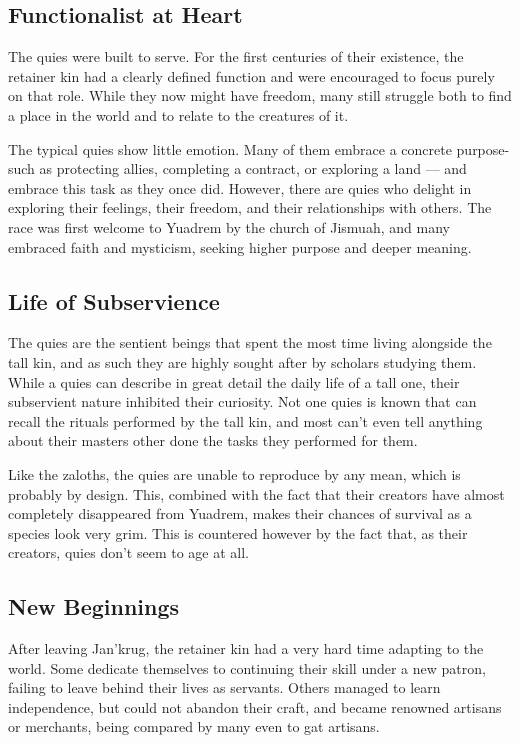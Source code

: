 \subsection*{Functionalist at Heart}
    The quies were built to serve.
    For the first centuries of their existence, the retainer kin had a clearly defined function and were encouraged to focus purely on that role.
    While they now might have freedom, many still struggle both to find a place in the world and to relate to the creatures of it.

    The typical quies show little emotion.
    Many of them embrace a concrete purpose-such as protecting allies, completing a contract, or exploring a land --- and embrace this task as they once did.
    However, there are quies who delight in exploring their feelings, their freedom, and their relationships with others.
    The race was first welcome to Yuadrem by the church of Jismuah, and many embraced faith and mysticism, seeking higher purpose and deeper meaning.

\subsection*{Life of Subservience}
    The quies are the sentient beings that spent the most time living alongside the tall kin, and as such they are highly sought after by scholars studying them.
    While a quies can describe in great detail the daily life of a tall one, their subservient nature inhibited their curiosity.
    Not one quies is known that can recall the rituals performed by the tall kin, and most can't even tell anything about their masters other done the tasks they performed for them.

    Like the zaloths, the quies are unable to reproduce by any mean, which is probably by design.
    This, combined with the fact that their creators have almost completely disappeared from Yuadrem, makes their chances of survival as a species look very grim.
    This is countered however by the fact that, as their creators, quies don't seem to age at all.

\subsection*{New Beginnings}
    After leaving Jan'krug, the retainer kin had a very hard time adapting to the world.
    Some dedicate themselves to continuing their skill under a new patron, failing to leave behind their lives as servants.
    Others managed to learn independence, but could not abandon their craft, and became renowned artisans or merchants, being compared by many even to gat artisans.

